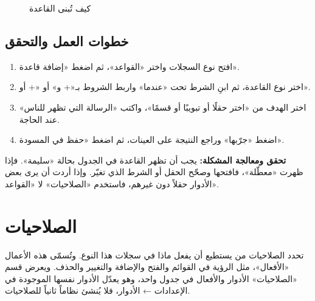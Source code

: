 \begin{figure}[H]
\centering
{}
\rclegend
\caption{كيف تُبنى القاعدة}
\label{fig:builder-rules-flow}
\end{figure}

\subsection{خطوات العمل والتحقق}
\begin{enumerate}
\item افتح نوع السجلات واختر «القواعد»، ثم اضغط «إضافة قاعدة».
\item اختر نوع القاعدة، ثم ابنِ الشرط تحت «عندما» واربط الشروط بـ«+ و» أو «+ أو».
\item اختر الهدف من «اختر حقلًا أو تبويبًا أو قسمًا»، واكتب «الرسالة التي تظهر للناس» عند الحاجة.
\item اضغط «جرّبها» وراجع النتيجة على العينات، ثم اضغط «حفظ في المسودة».
\end{enumerate}

\textbf{تحقق ومعالجة المشكلة:} يجب أن تظهر القاعدة في الجدول بحالة «سليمة». فإذا ظهرت «معطّلة»، فافتحها وصحّح الحقل أو الشرط الذي تغيّر. وإذا أردت أن يرى بعض الأدوار حقلاً دون غيرهم، فاستخدم «الصلاحيات» لا «القواعد».

\clearpage
\section{الصلاحيات}
\label{sec:builder-feature-access}

تحدد الصلاحيات من يستطيع أن يفعل ماذا في سجلات هذا النوع. وتُسمّى هذه الأعمال «الأفعال»، مثل الرؤية في القوائم والفتح والإضافة والتغيير والحذف. ويعرض قسم «الصلاحيات» الأدوار والأفعال في جدول واحد، وهو يعدّل الأدوار نفسها الموجودة في الإعدادات ← الأدوار، فلا يُنشئ نظاماً ثانياً للصلاحيات.

